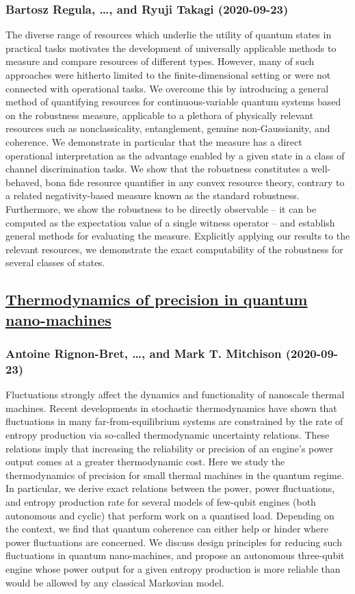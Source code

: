 \subsubsection*{Bartosz Regula, \dots, and Ryuji Takagi (2020-09-23)}
The diverse range of resources which underlie the utility of quantum states
in practical tasks motivates the development of universally applicable methods
to measure and compare resources of different types. However, many of such
approaches were hitherto limited to the finite-dimensional setting or were not
connected with operational tasks. We overcome this by introducing a general
method of quantifying resources for continuous-variable quantum systems based
on the robustness measure, applicable to a plethora of physically relevant
resources such as nonclassicality, entanglement, genuine non-Gaussianity, and
coherence. We demonstrate in particular that the measure has a direct
operational interpretation as the advantage enabled by a given state in a class
of channel discrimination tasks. We show that the robustness constitutes a
well-behaved, bona fide resource quantifier in any convex resource theory,
contrary to a related negativity-based measure known as the standard
robustness. Furthermore, we show the robustness to be directly observable -- it
can be computed as the expectation value of a single witness operator -- and
establish general methods for evaluating the measure. Explicitly applying our
results to the relevant resources, we demonstrate the exact computability of
the robustness for several classes of states.

\subsection*{\href{http://arxiv.org/abs/2009.11303v2}{Thermodynamics of precision in quantum nano-machines}}
\subsubsection*{Antoine Rignon-Bret, \dots, and Mark T. Mitchison (2020-09-23)}
Fluctuations strongly affect the dynamics and functionality of nanoscale
thermal machines. Recent developments in stochastic thermodynamics have shown
that fluctuations in many far-from-equilibrium systems are constrained by the
rate of entropy production via so-called thermodynamic uncertainty relations.
These relations imply that increasing the reliability or precision of an
engine's power output comes at a greater thermodynamic cost. Here we study the
thermodynamics of precision for small thermal machines in the quantum regime.
In particular, we derive exact relations between the power, power fluctuations,
and entropy production rate for several models of few-qubit engines (both
autonomous and cyclic) that perform work on a quantised load. Depending on the
context, we find that quantum coherence can either help or hinder where power
fluctuations are concerned. We discuss design principles for reducing such
fluctuations in quantum nano-machines, and propose an autonomous three-qubit
engine whose power output for a given entropy production is more reliable than
would be allowed by any classical Markovian model.

